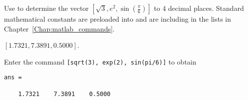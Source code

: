 \documentclass{ximera}
\begin{document}
\begin{computerExercise} \label{YZ_1.2_operation2}
Use \Matlab to determine the vector $[\sqrt{3}, e^2, \sin(\frac{\pi}{6})]$ to 4 decimal places.
Standard mathematical constants are preloaded into \Matlab and are including in the lists in Chapter~\ref{Chap:matlab_commands}.

\begin{solution}
\ans $[1.7321, 7.3891, 0.5000]$.

\soln
Enter the \Matlab command {\tt [sqrt(3), exp(2), sin(pi/6)]} to obtain
\begin{verbatim}
ans =

    1.7321    7.3891    0.5000
\end{verbatim}
\end{solution}
\end{computerExercise}
\end{document}
